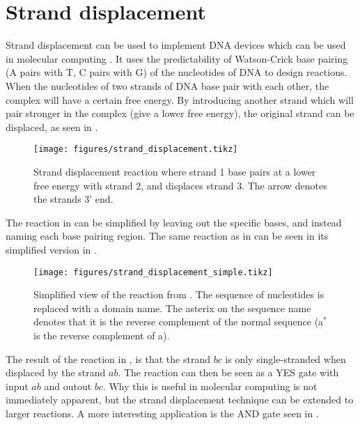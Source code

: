 \section{Strand displacement}

Strand displacement can be used to implement DNA devices which can be used in molecular computing \cite{Zhang2011}. It uses the predictability of Watson-Crick base pairing (A pairs with T, C pairs with G) of the nucleotides of DNA to design reactions. When the nucleotides of two strands of DNA base pair with each other, the complex will have a certain free energy. By introducing another strand which will pair stronger in the complex (give a lower free energy), the original strand can be displaced, as seen in .

\begin{figure}[H]
\centering
\texttt{[image: figures/strand\_displacement.tikz]}
\caption{Strand displacement reaction where strand 1 base pairs at a lower free energy with strand 2, and displaces strand 3. The arrow denotes the strands 3' end.}
\label{strand_displacement}
\end{figure}

The reaction in  can be simplified by leaving out the specific bases, and instead naming each base pairing region. The same reaction as in  can be seen in its simplified version in .

\begin{figure}[H]
\centering
\texttt{[image: figures/strand\_displacement\_simple.tikz]}
\caption{Simplified view of the reaction from . The sequence of nucleotides is replaced with a domain name. The asterix on the sequence name denotes that it is the reverse complement of the normal sequence (a$^*$ is the reverse complement of a).}
\label{strand_displacement_simple}
\end{figure}

The result of the reaction in , is that the strand $bc$ is only single-stranded when displaced by the strand $ab$. The reaction can then be seen as a YES gate with input $ab$ and outout $bc$. Why this is useful in molecular computing is not immediately apparent, but the strand displacement technique can be extended to larger reactions. A more interesting application is the AND gate seen in .

